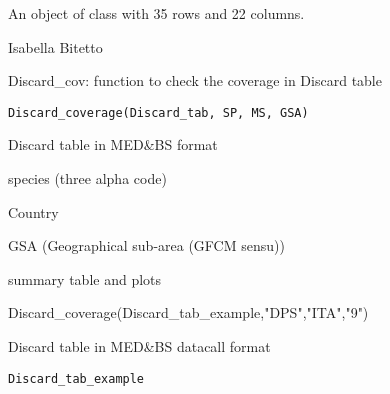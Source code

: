 \documentclass[a4paper]{book}
\begin{document}
%
\begin{Format}
An object of class  with 35 rows and 22 columns.
\end{Format}
%
\begin{Author}\relax
Isabella Bitetto 
\end{Author}
%
\begin{Description}\relax
Discard\_cov: function to check the coverage in Discard table
\end{Description}
%
\begin{Usage}
\begin{verbatim}
Discard_coverage(Discard_tab, SP, MS, GSA)
\end{verbatim}
\end{Usage}
%
\begin{Arguments}
\begin{ldescription}
\item[\code{Discard\_tab}] Discard table in MED\&BS format

\item[\code{SP}] species (three alpha code)

\item[\code{MS}] Country

\item[\code{GSA}] GSA (Geographical sub-area (GFCM sensu))
\end{ldescription}
\end{Arguments}
%
\begin{Value}
summary table and plots
\end{Value}
%
\begin{Examples}
\begin{ExampleCode}
Discard_coverage(Discard_tab_example,"DPS","ITA","9")
\end{ExampleCode}
\end{Examples}
%
\begin{Description}\relax
Discard table in MED\&BS datacall format
\end{Description}
%
\begin{Usage}
\begin{verbatim}
Discard_tab_example
\end{verbatim}
\end{Usage}
\end{document}
